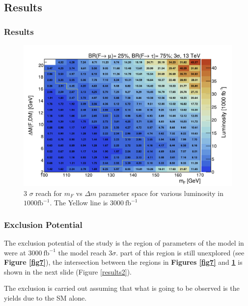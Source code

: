 \documentclass{beamer}
\begin{document}
\begin{frame}
\section{Results}
\frametitle{Results}

\begin{figure}
	\centering

	\includegraphics[scale=0.45]{pictures/LumiToExclusionSigma3_BRmu25tau75} 
	\caption{3 $\sigma$ reach for $m_{F}$ vs  $\Delta m$ parameter space for various luminosity in $1000\text{fb}^{-1}$. The Yellow line is $3000~\text{fb}^{-1}$}
	\label{results}
\end{figure}

\end{frame}



\begin{frame}
\frametitle{Exclusion Potential}
\begin{justify}

The exclusion potential of the study is the region of parameters of the model in were at $3000~\text{fb}^{-1}$ the model reach $3\sigma$. part of this region is still unexplored (see \textbf{Figure \ref{fig7}}), the intersection between the regions in \textbf{Figures \ref{fig7}} and \textbf{\ref{results}} is shown in the next slide (Figure \ref{results2}).

The exclusion is carried out assuming that what is going to be observed is the yields due to the SM alone.
\end{justify}
\end{frame}
\end{document}
